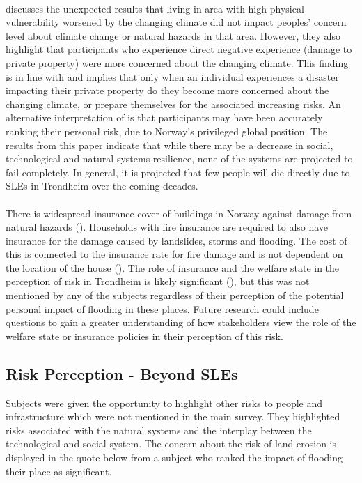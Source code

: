 \paragraph{}

\cite{lujala_climate_2015} discusses the unexpected results that living in area with high physical vulnerability worsened by the changing climate did not impact peoples' concern level about climate change or natural hazards in that area. However, they also highlight that participants who experience direct negative experience (damage to private property) were more concerned about the changing climate. This finding is in line with \cite{whitmarsh_are_2008} and implies that only when an individual experiences a disaster impacting their private property do they become more concerned about the changing climate, or prepare themselves for the associated increasing risks. An alternative interpretation of \cite{lujala_climate_2015} is that participants may have been accurately ranking their personal risk, due to Norway's privileged global position. The results from this paper indicate that while there may be a decrease in social, technological and natural systems resilience, none of the systems are projected to fail completely. In general, it is projected that few people will die directly due to SLEs in Trondheim over the coming decades.
\paragraph{}


There is widespread insurance cover of buildings in Norway against damage from natural hazards (\cite{lujala_role_2020}). Households with fire insurance are required to also have insurance for the damage caused by landslides, storms and flooding. The cost of this is connected to the insurance rate for fire damage and is not dependent on the location of the house (\cite{lujala_role_2020}). The role of insurance and the welfare state in the perception of risk in Trondheim is likely significant (\cite{lujala_role_2020}), but this was not mentioned by any of the subjects regardless of their perception of the potential personal impact of flooding in these places. Future research could include questions to gain a greater understanding of how stakeholders view the role of the welfare state or insurance policies in their perception of this risk. 

\subsection{Risk Perception - Beyond SLEs}
Subjects were given the opportunity to highlight other risks to people and infrastructure which were not mentioned in the main survey. They highlighted risks associated with the natural systems and the interplay between the technological and social system. The concern about the risk of land erosion is displayed in the quote below from a subject who ranked the impact of flooding their place as significant.

